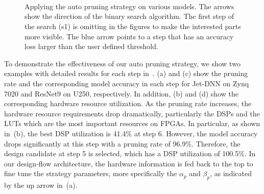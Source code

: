 \begin{figure} 
   \centering
 \\
  \\
    \\
  \vspace{0.2cm}
  \caption{ Applying the auto pruning strategy on various models. The arrows show the direction of the binary search algorithm. The first step of the search (s1) is omitting in the figures to make the interested parts more visible. The blue arrow points to a step that has an accuracy loss larger than the user defined threshold.  }
  \label{fig:auto_pruning} 
\end{figure}





To demonstrate the effectiveness of our auto pruning strategy, we show two examples with detailed results for each step in~. (a) and (c) show the pruning rate and the corresponding model accuracy in each step for Jet-DNN on Zynq 7020 and ResNet9 on U250, respectively.
In addition, (b) and (d) show the corresponding hardware resource utilization. As the pruning rate increases, the hardware resource requirements drop dramatically, particularly the DSPs and the LUTs which are the most important resources on FPGAs. In particular, as shown in~(b), the best DSP utilization is 41.4\% at step 6. However, the model accuracy drops significantly at this step with a pruning rate of 96.9\%. Therefore, the design candidate at step 5 is selected, which has a DSP utilization of 100.5\%. In our design-flow architecture, the hardware information is fed back to the top to fine tune the strategy parameters, more specifically the $\alpha_p$ and $\beta_p$, as indicated by the up arrow in~(a). 

